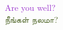 \documentclass[12pt,a4paper]{article}
\begin{document}
\centering
\textcolor{DarkOrchid}{Are you well?}\\
\textcolor{DarkOliveGreen}{\tamil நீங்கள் நலமா?}
\end{document}
